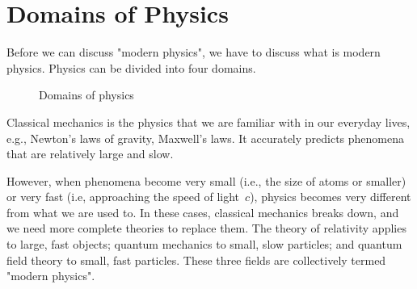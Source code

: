 \section{Domains of Physics}

Before we can discuss "modern physics",
we have to discuss what is modern physics.
Physics can be divided into four domains.

\begin{figure}[ht]
    \resizebox{\linewidth}{!}{}
    \caption{Domains of physics}
\end{figure}

Classical mechanics is the physics
that we are familiar with in our everyday lives,
e.g., Newton's laws of gravity, Maxwell's laws.
It accurately predicts phenomena that are relatively large and slow.

However, when phenomena become very small
(i.e., the size of atoms or smaller)
or very fast (i.e, approaching the speed of light~\(c\)),
physics becomes very different from what we are used to.
In these cases, classical mechanics breaks down,
and we need more complete theories to replace them.
The theory of relativity applies to large, fast objects;
quantum mechanics to small, slow particles;
and quantum field theory to small, fast particles.
These three fields are collectively termed "modern physics".

